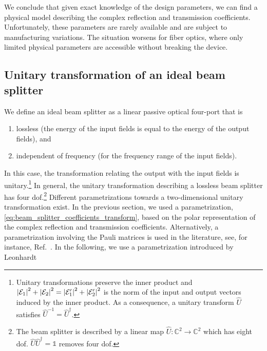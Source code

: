 We conclude that given exact knowledge of the design parameters, we can find a physical model describing the complex reflection and transmission coefficients.
Unfortunately, these parameters are rarely available and are subject to manufacturing variations.
The situation worsens for fiber optics, where only limited physical parameters are accessible without breaking the device.

\subsection{Unitary transformation of an ideal beam splitter}

We define an ideal beam splitter as a linear passive optical four-port that is
\begin{enumerate}
    \item lossless (the energy of the input fields is equal to the energy of the output fields), and
    \item independent of frequency (for the frequency range of the input fields).
\end{enumerate}
In this case, the transformation relating the output with the input fields is unitary.\footnote{Unitary transformations preserve the inner product and $\abs{\mathcal{E}_1}^2+\abs{\mathcal{E}_2}^2=\abs{\mathcal{E}^\prime_1}^2+\abs{\mathcal{E}^\prime_2}^2$ is the norm of the input and output vectors induced by the inner product. As a consequence, a unitary transform $\hat{U}$ satisfies $\hat{U}^{-1}=\hat{U}^\dagger$.}
In general, the unitary transformation describing a lossless beam splitter has four \gls{dof}.\footnote{The beam splitter is described by a linear map $\hat{U}\colon\mathbb{C}^2\to\mathbb{C}^2$ which has eight \gls{dof}. $\hat{U}\hat{U}^\dagger=\mathbb{1}$ removes four \gls{dof}.}
Different parametrizations towards a two-dimensional unitary transformation exist.
In the previous section, we used a parametrization, \cref{eq:beam_splitter_coefficients_transform}, based on the polar representation of the complex reflection and transmission coefficients.
Alternatively, a parametrization involving the Pauli matrices is used in the literature, see, for instance, Ref.~\cite{Zeilinger1981}.
In the following, we use a parametrization introduced by Leonhardt~\cite[p.~92]{Leonhardt2010}
